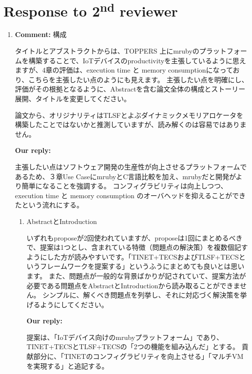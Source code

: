 \documentclass{article}
\newcommand\nd{\textsuperscript{nd}\xspace}
\begin{document}
\clearpage

\section{Response to 2\nd reviewer}

\begin{enumerate}

\item \begin{flushleft}
\textbf{Comment:} 構成

タイトルとアブストラクトからは、TOPPERS 上にmrubyのプラットフォームを構築することで、IoTデバイスのproductivityを主張しているように思えますが、4章の評価は、execution time と memory consumptionになっており、こちらを主張したい点のようにも見えます。
主張したい点を明確にし、評価がその根拠となるように、Abstractを含む論文全体の構成とストーリー展開、タイトルを変更してください。

論文から、オリジナリティはTLSFとよぶダイナミックメモリアロケータを構築したことではないかと推測していますが、読み解くのは容易ではありません。
\begin{flushleft}
\textbf{Our reply:}

主張したい点はソフトウェア開発の生産性が向上させるプラットフォームであるため、３章Use CaseにmrubyとC言語比較を加え、mrubyだと開発がより簡単になることを強調する。
コンフィグラビリティは向上しつつ、execution time と memory consumption のオーバヘッドを抑えることができたという流れにする。
\end{flushleft}
\begin{enumerate}
\item AbstractとIntroduction

いずれもproposeが2回使われていますが、proposeは1回にまとめるべきで、提案は1つとし、含まれている特徴（問題点の解決策）を複数個記すようにした方が読みやすいです。「TINET+TECSおよびTLSF+TECSというフレームワークを提案する」というふうにまとめても良いとは思います。
また、問題点が一般的な背景ばかりが記されていて、提案方法が必要である問題点をAbstractとIntroductionから読み取ることができません。
シンプルに、解くべき問題点を列挙し、それに対応づく解決策を挙げるようにしてください。

\begin{flushleft}
\textbf{Our reply:}

提案は、「IoTデバイス向けのmrubyプラットフォーム」であり、TINET+TECSとTLSF+TECSの「2つの機能を組み込んだ」とする。
貢献部分に、「TINETのコンフィグラビリティを向上させる」「マルチVMを実現する」と追記する。
\end{flushleft}


\end{enumerate}
\end{flushleft}
\end{enumerate}
\end{document}
